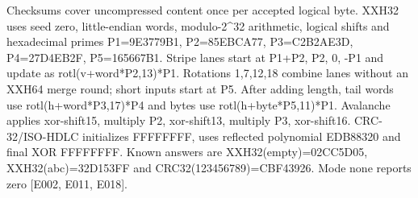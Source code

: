 \documentclass[11pt,a4paper]{article}
\begin{document}
Chec\allowbreak{}ksum\allowbreak{}s cove\allowbreak{}r unco\allowbreak{}mpre\allowbreak{}ssed cont\allowbreak{}ent once per acce\allowbreak{}pted logi\allowbreak{}cal byte. XXH3\allowbreak{}2 uses seed zero,\allowbreak{} litt\allowbreak{}le-endi\allowbreak{}an word\allowbreak{}s,\allowbreak{} modu\allowbreak{}lo-2\textasciicircum{}32 arit\allowbreak{}hmet\allowbreak{}ic,\allowbreak{} logi\allowbreak{}cal shif\allowbreak{}ts and hexa\allowbreak{}deci\allowbreak{}mal prim\allowbreak{}es P1=\allowbreak{}9E37\allowbreak{}79B1,\allowbreak{} P2=\allowbreak{}85EB\allowbreak{}CA77,\allowbreak{} P3=\allowbreak{}C2B2\allowbreak{}AE3D,\allowbreak{} P4=\allowbreak{}27D4\allowbreak{}EB2F,\allowbreak{} P5=\allowbreak{}1656\allowbreak{}67B1. Stri\allowbreak{}pe lane\allowbreak{}s star\allowbreak{}t at P1+\allowbreak{}P2,\allowbreak{} P2,\allowbreak{} 0,\allowbreak{} -P1 and upda\allowbreak{}te as rotl(\allowbreak{}v+\allowbreak{}word*\allowbreak{}P2,\allowbreak{}13)\allowbreak{}*\allowbreak{}P1. Rota\allowbreak{}tion\allowbreak{}s 1,\allowbreak{}7,\allowbreak{}12,\allowbreak{}18 comb\allowbreak{}ine lane\allowbreak{}s with\allowbreak{}out an XXH6\allowbreak{}4 merg\allowbreak{}e roun\allowbreak{}d; shor\allowbreak{}t inpu\allowbreak{}ts star\allowbreak{}t at P5. Afte\allowbreak{}r addi\allowbreak{}ng leng\allowbreak{}th,\allowbreak{} tail word\allowbreak{}s use rotl(\allowbreak{}h+\allowbreak{}word*\allowbreak{}P3,\allowbreak{}17)\allowbreak{}*\allowbreak{}P4 and byte\allowbreak{}s use rotl(\allowbreak{}h+\allowbreak{}byte*\allowbreak{}P5,\allowbreak{}11)\allowbreak{}*\allowbreak{}P1. Aval\allowbreak{}anch\allowbreak{}e appl\allowbreak{}ies xor-shif\allowbreak{}t15,\allowbreak{} mult\allowbreak{}iply P2,\allowbreak{} xor-shif\allowbreak{}t13,\allowbreak{} mult\allowbreak{}iply P3,\allowbreak{} xor-shif\allowbreak{}t16. CRC-32/\allowbreak{}ISO-HDLC init\allowbreak{}iali\allowbreak{}zes FFFF\allowbreak{}FFFF,\allowbreak{} uses refl\allowbreak{}ecte\allowbreak{}d poly\allowbreak{}nomi\allowbreak{}al EDB8\allowbreak{}8320 and fina\allowbreak{}l XOR FFFF\allowbreak{}FFFF. Know\allowbreak{}n answ\allowbreak{}ers are XXH3\allowbreak{}2(\allowbreak{}empt\allowbreak{}y)\allowbreak{}=\allowbreak{}02CC\allowbreak{}5D05,\allowbreak{} XXH3\allowbreak{}2(\allowbreak{}abc)\allowbreak{}=\allowbreak{}32D1\allowbreak{}53FF and CRC3\allowbreak{}2(\allowbreak{}1234\allowbreak{}5678\allowbreak{}9)\allowbreak{}=\allowbreak{}CBF4\allowbreak{}3926. Mode none repo\allowbreak{}rts zero [\allowbreak{}E002,\allowbreak{} E011,\allowbreak{} E018]\allowbreak{}.
\end{document}
